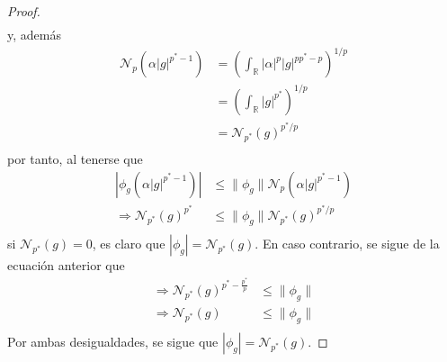 \documentclass[12pt]{report}
\theoremstyle{largebreak}
\newcommand\abs[1]{\ensuremath{\left|#1\right|}}
\newcommand{\N}[2]{\ensuremath{\mathcal{N}_{#1}\left(#2\right)}}
\begin{document}
\begin{proof}
\begin{equation*}
\begin{split}
            \end{split}
        \end{equation*}
        y, además
        \begin{equation*}
            \begin{split}
                \N{p}{\alpha\abs{g}^{p^*-1}}&=\left(\int_{\mathbb{R}}\abs{\alpha}^p\abs{g}^{pp^*-p} \right)^{1/p}\\
                &=\left(\int_{\mathbb{R}}\abs{g}^{p^*} \right)^{1/p}\\
                &=\N{p^*}{g}^{p^*/p}\\
            \end{split}
        \end{equation*}
        por tanto, al tenerse que
        \begin{equation*}
            \begin{split}
                \abs{\phi_g(\alpha\abs{g}^{p^*-1})}&\leq\|\phi_g\|\N{p}{\alpha\abs{g}^{p^*-1}}\\
                \Rightarrow \N{p^*}{g}^{p^*}&\leq\|\phi_g\|\N{p^*}{g}^{p^*/p}\\
            \end{split}
        \end{equation*}
        si $\N{p^*}{g}=0$, es claro que $\abs{\phi_g}=\N{p^*}{g}$. En caso contrario, se sigue de la ecuación anterior que
        \begin{equation*}
            \begin{split}
                \Rightarrow \N{p^*}{g}^{p^*-\frac{p^*}{p}}&\leq\|\phi_g\|\\
                \Rightarrow \N{p^*}{g}&\leq\|\phi_g\|\\
            \end{split}
        \end{equation*}
        Por ambas desigualdades, se sigue que $\abs{\phi_g}=\N{p^*}{g}$.


\end{proof}
\end{document}
